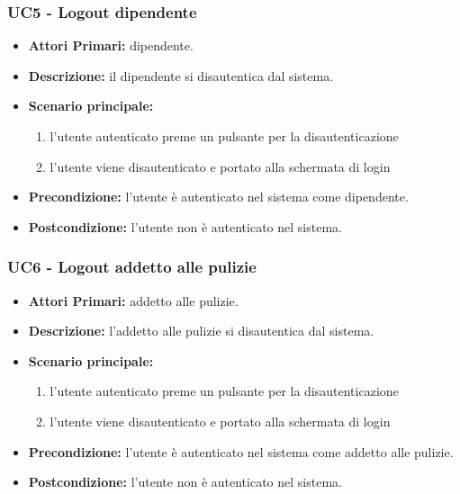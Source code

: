 \subsubsection{ UC5 - Logout dipendente}
\begin{itemize}
	\item\textbf{Attori Primari:} 
	dipendente.
	\item\textbf{Descrizione:} 
	il dipendente si disautentica dal sistema.
	\item\textbf{Scenario principale:} 
	\begin{enumerate}
		\item l'utente autenticato preme un pulsante per la disautenticazione
		\item l'utente viene disautenticato e portato alla schermata di login
	\end{enumerate}
	\item\textbf{Precondizione:} 
	l'utente è autenticato nel sistema come dipendente.
	\item\textbf{Postcondizione:}
	l'utente non è autenticato nel sistema.
\end{itemize}

\subsubsection{ UC6 - Logout addetto alle pulizie}
\begin{itemize}
	\item\textbf{Attori Primari:} 
	addetto alle pulizie.
	\item\textbf{Descrizione:} 
	l'addetto alle pulizie si disautentica dal sistema.
	\item\textbf{Scenario principale:} 
	\begin{enumerate}
		\item l'utente autenticato preme un pulsante per la disautenticazione
		\item l'utente viene disautenticato e portato alla schermata di login
	\end{enumerate}
	\item\textbf{Precondizione:} 
	l'utente è autenticato nel sistema come addetto alle pulizie.
	\item\textbf{Postcondizione:}
	l'utente non è autenticato nel sistema.
\end{itemize}

